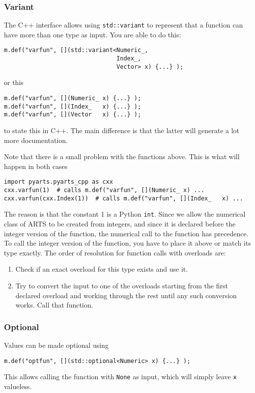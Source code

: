 \subsubsection{Variant}
The C++ interface allows using \texttt{std::variant} to represent that a function can have more than one type as input.
You are able to do this:
\begin{verbatim}
m.def("varfun", [](std::variant<Numeric_,
                                Index_,
                                Vector> x) {...} );
\end{verbatim}
or this
\begin{verbatim}
m.def("varfun", [](Numeric_ x) {...} );
m.def("varfun", [](Index_   x) {...} );
m.def("varfun", [](Vector   x) {...} );
\end{verbatim}
to state this in C++.  The main difference is that the latter will generate a lot more documentation.

Note that there is a small problem with the functions above.  This is what will happen in both cases
\begin{verbatim}
import pyarts.pyarts_cpp as cxx
cxx.varfun(1)  # calls m.def("varfun", [](Numeric_ x) ...
cxx.varfun(cxx.Index(1))  # calls m.def("varfun", [](Index_   x) ...
\end{verbatim}
The reason is that the constant 1 is a Python \texttt{int}.  Since we allow the numerical
class of ARTS to be created from integers, and since it is declared before the integer version of the function, the 
numerical call to the function has precedence.  To call the integer version of the function, you
have to place it above or match its type exactly.  The order of resolution for function calls with overloads are:
\begin{enumerate}
\item Check if an exact overload for this type exists and use it.
\item Try to convert the input to one of the overloads starting from the first declared overload and working through the rest until any such conversion works.  Call that function.
\end{enumerate}

\subsubsection{Optional}
Values can be made optional using
\begin{verbatim}
m.def("optfun", [](std::optional<Numeric> x) {...} );
\end{verbatim}
This allows calling the function with \texttt{None} as input, which will simply leave \texttt{x} valueless.
